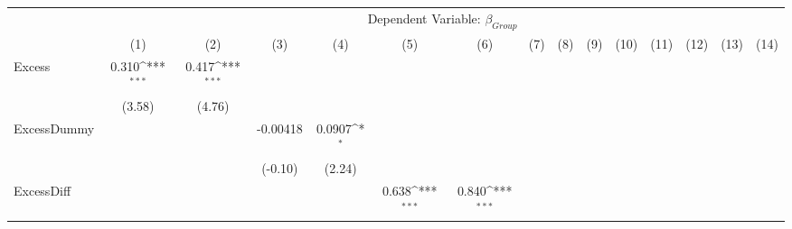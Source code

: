 {
\def\sym#1{\ifmmode^{#1}\else\(^{#1}\)\fi}
\begin{tabular}{l*{14}{c}}
\hline\hline
                &\multicolumn{14}{c}{Dependent Variable: $ \beta_{Group} $ }                                                                                                                                                                                                              \\\cmidrule(lr){2-15}
                &\multicolumn{1}{c}{(1)}         &\multicolumn{1}{c}{(2)}         &\multicolumn{1}{c}{(3)}         &\multicolumn{1}{c}{(4)}         &\multicolumn{1}{c}{(5)}         &\multicolumn{1}{c}{(6)}         &\multicolumn{1}{c}{(7)}         &\multicolumn{1}{c}{(8)}         &\multicolumn{1}{c}{(9)}         &\multicolumn{1}{c}{(10)}         &\multicolumn{1}{c}{(11)}         &\multicolumn{1}{c}{(12)}         &\multicolumn{1}{c}{(13)}         &\multicolumn{1}{c}{(14)}         \\
\hline
Excess          &    0.310\sym{***}&    0.417\sym{***}&                  &                  &                  &                  &                  &                  &                  &                  &                  &                  &                  &                  \\
                &   (3.58)         &   (4.76)         &                  &                  &                  &                  &                  &                  &                  &                  &                  &                  &                  &                  \\
[1em]
ExcessDummy     &                  &                  & -0.00418         &   0.0907\sym{*}  &                  &                  &                  &                  &                  &                  &                  &                  &                  &                  \\
                &                  &                  &  (-0.10)         &   (2.24)         &                  &                  &                  &                  &                  &                  &                  &                  &                  &                  \\
[1em]
ExcessDiff      &                  &                  &                  &                  &    0.638\sym{***}&    0.840\sym{***}&                  &                  &                  &                  &                  &                  &                  &                  \\

\end{tabular}}
